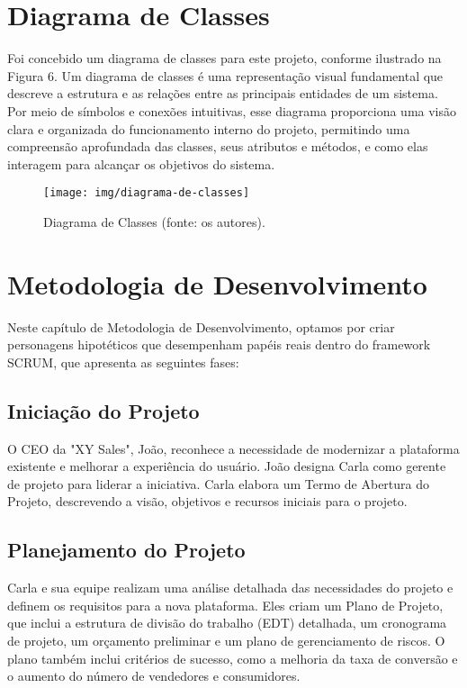 \documentclass[
	12pt,				%
	openright,			%
	twoside,			%
	a4paper,			%
	english,			%
	brazil				%
	]{abntex2}
\begin{document}
\section{Diagrama de Classes}

Foi concebido um diagrama de classes para este projeto, conforme ilustrado na Figura 6. Um diagrama de classes é uma representação visual fundamental que descreve a estrutura e as relações entre as principais entidades de um sistema. Por meio de símbolos e conexões intuitivas, esse diagrama proporciona uma visão clara e organizada do funcionamento interno do projeto, permitindo uma compreensão aprofundada das classes, seus atributos e métodos, e como elas interagem para alcançar os objetivos do sistema.

\begin{figure}[htb]
	\centering
	\texttt{[image: img/diagrama-de-classes]}
	\caption{Diagrama de Classes (fonte: os autores).}
	\label{fig:diagrama-de-classes}
\end{figure}

\section{Metodologia de Desenvolvimento}

Neste capítulo de Metodologia de Desenvolvimento, optamos por criar personagens hipotéticos que desempenham papéis reais dentro do framework SCRUM, que apresenta as seguintes fases:

\subsection{Iniciação do Projeto}
O CEO da "XY Sales", João, reconhece a necessidade de modernizar a plataforma existente e melhorar a experiência do usuário. João designa Carla como gerente de projeto para liderar a iniciativa. Carla elabora um Termo de Abertura do Projeto, descrevendo a visão, objetivos e recursos iniciais para o projeto.

\subsection{Planejamento do Projeto}
Carla e sua equipe realizam uma análise detalhada das necessidades do projeto e definem os requisitos para a nova plataforma. Eles criam um Plano de Projeto, que inclui a estrutura de divisão do trabalho (EDT) detalhada, um cronograma de projeto, um orçamento preliminar e um plano de gerenciamento de riscos. O plano também inclui critérios de sucesso, como a melhoria da taxa de conversão e o aumento do número de vendedores e consumidores.
\end{document}
